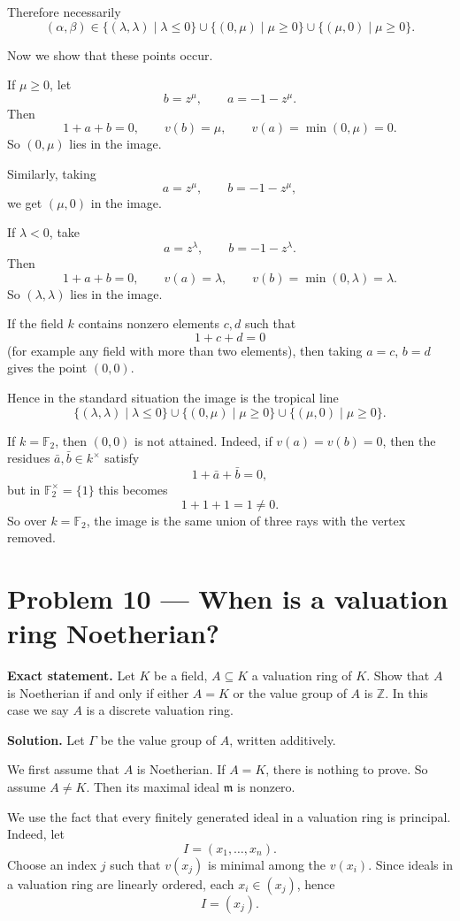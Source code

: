 \documentclass[12pt,a4paper,oneside]{report}
\theoremstyle{notespace}
\begin{document}
Therefore necessarily
\[
(\alpha,\beta)\in
\{(\lambda,\lambda)\mid \lambda\le 0\}
\cup
\{(0,\mu)\mid \mu\ge 0\}
\cup
\{(\mu,0)\mid \mu\ge 0\}.
\]

Now we show that these points occur.

If \(\mu\ge 0\), let
\[
b=z^\mu,\qquad a=-1-z^\mu.
\]
Then
\[
1+a+b=0,
\qquad
v(b)=\mu,
\qquad
v(a)=\min(0,\mu)=0.
\]
So \((0,\mu)\) lies in the image.

Similarly, taking
\[
a=z^\mu,\qquad b=-1-z^\mu,
\]
we get \((\mu,0)\) in the image.

If \(\lambda<0\), take
\[
a=z^\lambda,\qquad b=-1-z^\lambda.
\]
Then
\[
1+a+b=0,
\qquad
v(a)=\lambda,
\qquad
v(b)=\min(0,\lambda)=\lambda.
\]
So \((\lambda,\lambda)\) lies in the image.

If the field \(k\) contains nonzero elements \(c,d\) such that
\[
1+c+d=0
\]
(for example any field with more than two elements), then taking \(a=c\), \(b=d\) gives the point \((0,0)\).

Hence in the standard situation the image is the tropical line
\[
\{(\lambda,\lambda)\mid \lambda\le 0\}
\cup
\{(0,\mu)\mid \mu\ge 0\}
\cup
\{(\mu,0)\mid \mu\ge 0\}.
\]

\medskip

If \(k=\mathbb F_2\), then \((0,0)\) is not attained. Indeed, if \(v(a)=v(b)=0\), then the residues \(\bar a,\bar b\in k^\times\) satisfy
\[
1+\bar a+\bar b=0,
\]
but in \(\mathbb F_2^\times=\{1\}\) this becomes
\[
1+1+1=1\neq 0.
\]
So over \(k=\mathbb F_2\), the image is the same union of three rays with the vertex removed.

\bigskip

\section{Problem 10 --- When is a valuation ring Noetherian?}

\textbf{Exact statement.}
Let \(K\) be a field, \(A\subseteq K\) a valuation ring of \(K\). Show that \(A\) is Noetherian if and only if either \(A=K\) or the value group of \(A\) is \(\mathbb Z\). In this case we say \(A\) is a discrete valuation ring.

\textbf{Solution.}
Let \(\Gamma\) be the value group of \(A\), written additively.

We first assume that \(A\) is Noetherian. If \(A=K\), there is nothing to prove. So assume \(A\neq K\). Then its maximal ideal \(\mathfrak m\) is nonzero.

We use the fact that every finitely generated ideal in a valuation ring is principal. Indeed, let
\[
I=(x_1,\dots,x_n).
\]
Choose an index \(j\) such that \(v(x_j)\) is minimal among the \(v(x_i)\). Since ideals in a valuation ring are linearly ordered, each \(x_i\in (x_j)\), hence
\[
I=(x_j).
\]
\end{document}
